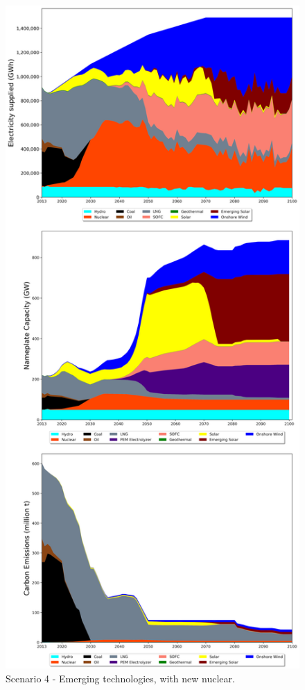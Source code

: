 \begin{figure}[H] 
\centering
\vspace*{-3cm}
\includegraphics[scale=0.41]{figures/newtechs_nuc}
\caption{Scenario 4 - Emerging technologies, with new nuclear.}
\label{scen4}
\end{figure}

